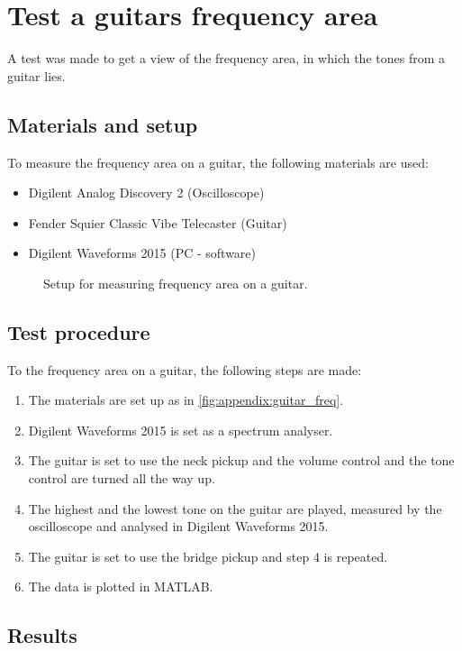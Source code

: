 \chapter{Test a guitars frequency area}\label{app:frequency_area}
A test was made to get a view of the frequency area, in which the tones from a guitar lies.

\section*{Materials and setup}
To measure the frequency area on a guitar, the following materials are used:
\begin{itemize}
\item Digilent Analog Discovery 2 (Oscilloscope)
\item Fender Squier Classic Vibe Telecaster (Guitar)
\item Digilent Waveforms 2015 (PC - software)
\end{itemize}

\begin{figure}[htbp!]
\centering
\def\svgwidth{\columnwidth}

\caption{Setup for measuring frequency area on a guitar.}
		\label{fig:appendix:guitar_freq}
\end{figure}

\section*{Test procedure}
To the frequency area on a guitar, the following steps are made:
\begin{enumerate}
\item The materials are set up as in \autoref{fig:appendix:guitar_freq}.
\item Digilent Waveforms 2015 is set as a spectrum analyser. 
\item The guitar is set to use the neck pickup and the volume control and the tone control are turned all the way up.
\item The highest and the lowest tone on the guitar are played, measured by the oscilloscope and analysed in Digilent Waveforms 2015.
\item The guitar is set to use the bridge pickup and step 4 is repeated. 
\item The data is plotted in MATLAB.
\end{enumerate}

\section*{Results}

